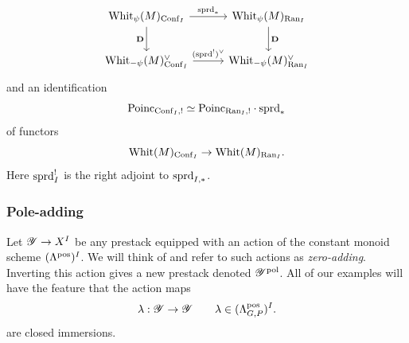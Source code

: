 \begin{itemize}
\begin{equation}
        \label{eqn:sprd_I_duality}
        \begin{tikzcd}[
          column sep={11em,between origins},
          row sep={4em,between origins}
        ]
            \Whit_\psi(M)_{\Conf_I} \arrow[r, "\sprd_*"] \arrow[d, "\DD" left] & \Whit_\psi(M)_{\Ran_I} \arrow[d, "\DD"] \\
            \Whit_{-\psi}(M)_{\Conf_I}^\vee \arrow[r, "(\sprd^!)^\vee"] & \Whit_{-\psi}(M)_{\Ran_I}^\vee
        \end{tikzcd}
        \end{equation}
    and an identification
        \begin{equation}
        \label{eqn:sprd_I_Poinc}
            \mathrm{Poinc}_{\mathrm{Conf}_I,!} \simeq \mathrm{Poinc}_{\mathrm{Ran}_I,!} \cdot \mathrm{sprd}_*
        \end{equation}
    of functors
        \[\mathrm{Whit}(M)_{\mathrm{Conf}_I} \to \mathrm{Whit}(M)_{\mathrm{Ran}_I}.\]
    Here $\mathrm{sprd}_I^!$ is the right adjoint to $\mathrm{sprd}_{I,*}$.
\end{itemize}

\subsubsection{Pole-adding} Let $\mathscr{Y} \to X^I$ be any prestack equipped with an action of the constant monoid scheme $(\Lambda^{\mathrm{pos}})^I$. We will think of and refer to such actions as \emph{zero-adding}. Inverting this action gives a new prestack denoted $\mathscr{Y}^{\mathrm{pol}}$. All of our examples will have the feature that the action maps
  \[\lambda : \mathscr{Y} \to \mathscr{Y}  \qquad \lambda \in (\Lambda_{G,P}^{\mathrm{pos}})^I.\]
are closed immersions.

